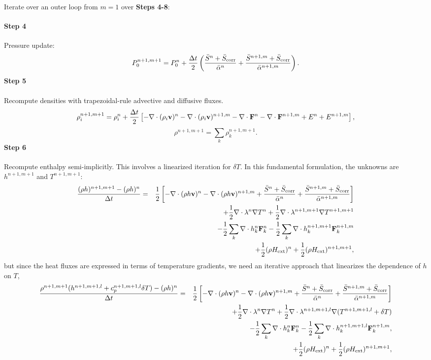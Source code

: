 \documentclass[final]{siamltex}
\def\Fb {{\bf F}}
\def\vb {{\bf v}}
\def\Hext {H_{\rm ext}}
\def\half   {\frac{1}{2}}
\begin{document}
Iterate over an outer loop from $m=1$ over {\bf Steps 4-8}:\\ \\
{\bf Step 4}\\ \\
Pressure update:
\begin{equation}
P_0^{n+1,m+1} = P_0^n + \frac{\Delta t}{2}\left(\frac{\bar{S}^n + \bar{S}_{\rm corr}}{\bar{\alpha}^n} + \frac{\bar{S}^{n+1,m} + \bar{S}_{\rm corr}}{\bar{\alpha}^{n+1,m}}\right).
\end{equation}
{\bf Step 5}\\ \\
Recompute densities with trapezoidal-rule advective and diffusive fluxes.
\begin{equation}
\rho_i^{n+1,m+1} = \rho_i^n + \frac{\Delta t}{2}\left[-\nabla\cdot(\rho_i\vb)^n -\nabla\cdot(\rho_i\vb)^{n+1,m} - \nabla\cdot\Fb^n - \nabla\cdot\Fb^{n+1,m} + E^n + E^{n+1,m}\right],
\end{equation}
\begin{equation}
\rho^{n+1,m+1} = \sum_k\rho_k^{n+1,m+1}.
\end{equation}
{\bf Step 6}\\ \\
Recompute enthalpy semi-implicitly.  This involves a linearized iteration 
for $\delta T$.  In this fundamental formulation, the unknowns 
are $h^{n+1,m+1}$ and $T^{n+1,m+1}$:
\begin{eqnarray}
\frac{(\rho h)^{n+1,m+1} - (\rho h)^n}{\Delta t} &=& \half\left[-\nabla\cdot(\rho h\vb)^n -\nabla\cdot(\rho h\vb)^{n+1,m} + \frac{\bar{S}^n + \bar{S}_{\rm corr}}{\bar{\alpha}^n} + \frac{\bar{S}^{n+1,m}+ \bar{S}_{\rm corr}}{\bar{\alpha}^{n+1,m}}\right]\nonumber\\
&&+ \half\nabla\cdot\lambda^n\nabla T^n + \half\nabla\cdot\lambda^{n+1,m+1}\nabla T^{n+1,m+1}\nonumber\\
&&- \half\sum_k\nabla\cdot h_k^n\Fb_k^n - \half\sum_k\nabla\cdot h_k^{n+1,m+1}\Fb_k^{n+1,m}\nonumber\\
&&+ \half(\rho\Hext)^n + \half(\rho\Hext)^{n+1,m+1},
\end{eqnarray}
but since the heat fluxes are expressed in terms of temperature gradients, we
need an iterative approach that linearizes the dependence of $h$ on $T$,
\begin{eqnarray}
\frac{\rho^{n+1,m+1}(h^{n+1,m+1,l} + c_p^{n+1,m+1,l}\delta T) - (\rho h)^n}{\Delta t} &=& \half\left[-\nabla\cdot(\rho h\vb)^n -\nabla\cdot(\rho h\vb)^{n+1,m} + \frac{\bar{S}^n + \bar{S}_{\rm corr}}{\bar{\alpha}^n} + \frac{\bar{S}^{n+1,m}+ \bar{S}_{\rm corr}}{\bar{\alpha}^{n+1,m}}\right]\nonumber\\
&&\hspace{-1in} + \half\nabla\cdot\lambda^n\nabla T^n + \half\nabla\cdot\lambda^{n+1,m+1,l}\nabla(T^{n+1,m+1,l} + \delta T)\nonumber\\
&&\hspace{-1in} - \half\sum_k\nabla\cdot h_k^n \Fb_k^n - \half\sum_k\nabla\cdot h_k^{n+1,m+1,l} \Fb_k^{n+1,m},\nonumber\\
&&\hspace{-1in} + \half(\rho\Hext)^n + \half(\rho\Hext)^{n+1,m+1},
\end{eqnarray}
\end{document}
